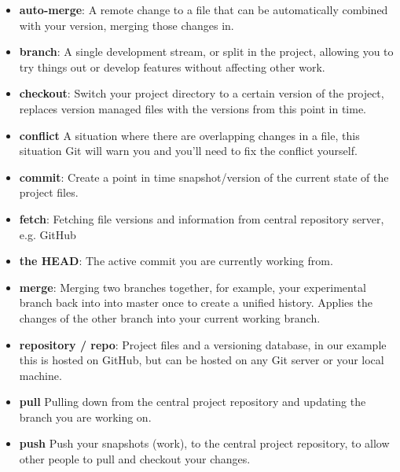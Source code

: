 \begin{itemize}[leftmargin=*]
	\item
	\textbf{auto-merge}:
		A remote change to a file that can be automatically combined with your version, merging those changes in.
	\item
		\textbf{branch}:
		A single development stream, or split in the project, allowing you to try things out or develop features without affecting other work.
	\item
		\textbf{checkout}:
		Switch your project directory to a certain version of the project, replaces version managed files with the versions from this point in time.
	\item
		\textbf{conflict}
		A situation where there are overlapping changes in a file, this situation Git will warn you and you’ll need to fix the conflict yourself.
	\item
		\textbf{commit}:
		Create a point in time snapshot/version of the current state of the project files.
	\item
        \textbf{fetch}:
		Fetching file versions and information from central repository server, e.g. GitHub
	\item
        \textbf{the HEAD}:
		The active commit you are currently working from.
	\item
		\textbf{merge}:
		Merging two branches together, for example, your experimental branch back into into master once to create a unified history. Applies the changes of the other branch into your current working branch.
    \item
        \textbf{repository / repo}:
        Project files and a versioning database, in our example this is hosted on GitHub, but can be hosted on any Git server or your local machine.
    \item
    	\textbf{pull}
    	Pulling down from the central project repository and updating the branch you are working on.
    \item
    	\textbf{push}
    	Push your snapshots (work), to the central project repository, to allow other people to pull and checkout your changes.
\end{itemize}